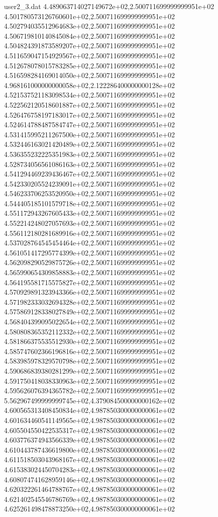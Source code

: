 \begin{filecontents}{user2_3.dat}
4.489063714027149672e+02,2.500711699999999951e+02
4.501780573126760601e+02,2.500711699999999951e+02
4.502794035512964683e+02,2.500711699999999951e+02
4.506719810140845084e+02,2.500711699999999951e+02
4.504824391873589207e+02,2.500711699999999951e+02
4.511659047154929567e+02,2.500711699999999951e+02
4.512678078015783285e+02,2.500711699999999951e+02
4.516598284169014050e+02,2.500711699999999951e+02
4.968161000000000058e+02,2.122286400000000128e+02
4.521537521183098534e+02,2.500711699999999951e+02
4.522562120518601887e+02,2.500711699999999951e+02
4.526476758197183017e+02,2.500711699999999951e+02
4.524614788487584747e+02,2.500711699999999951e+02
4.531415995211267500e+02,2.500711699999999951e+02
4.532446163021420489e+02,2.500711699999999951e+02
4.536355232225351983e+02,2.500711699999999951e+02
4.528734056561086163e+02,2.500711699999999951e+02
4.541294469239436467e+02,2.500711699999999951e+02
4.542330205524239091e+02,2.500711699999999951e+02
4.546233706253520950e+02,2.500711699999999951e+02
4.544405185101579718e+02,2.500711699999999951e+02
4.551172943267605433e+02,2.500711699999999951e+02
4.552214248027057693e+02,2.500711699999999951e+02
4.556112180281689916e+02,2.500711699999999951e+02
4.537028764545454464e+02,2.500711699999999951e+02
4.561051417295774399e+02,2.500711699999999951e+02
4.562098290529875726e+02,2.500711699999999951e+02
4.565990654309858883e+02,2.500711699999999951e+02
4.564195581715575827e+02,2.500711699999999951e+02
4.570929891323943366e+02,2.500711699999999951e+02
4.571982333032694328e+02,2.500711699999999951e+02
4.575869128338027849e+02,2.500711699999999951e+02
4.568404399095022654e+02,2.500711699999999951e+02
4.580808365352112332e+02,2.500711699999999951e+02
4.581866375535512930e+02,2.500711699999999951e+02
4.585747602366196816e+02,2.500711699999999951e+02
4.583985978329570798e+02,2.500711699999999951e+02
4.590686839380281299e+02,2.500711699999999951e+02
4.591750418038330963e+02,2.500711699999999951e+02
4.595626076394365782e+02,2.500711699999999951e+02
5.562967499999999745e+02,4.379084500000000162e+02
4.600565313408450834e+02,4.987850300000000061e+02
4.601634460541149565e+02,4.987850300000000061e+02
4.605504550422535317e+02,4.987850300000000061e+02
4.603776374943566339e+02,4.987850300000000061e+02
4.610443787436619800e+02,4.987850300000000061e+02
4.611518503043968167e+02,4.987850300000000061e+02
4.615383024450704283e+02,4.987850300000000061e+02
4.608074741628959146e+02,4.987850300000000061e+02
4.620322261464788767e+02,4.987850300000000061e+02
4.621402545546786769e+02,4.987850300000000061e+02
4.625261498478873250e+02,4.987850300000000061e+02

\end{filecontents}
